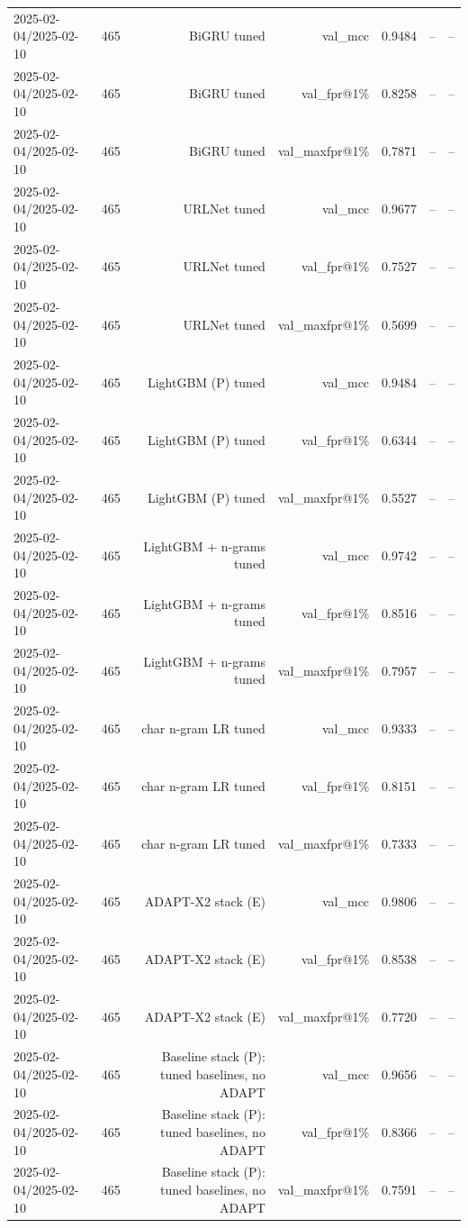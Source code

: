 \begin{table}[t]
\begin{tabular}{llrrrrr}
2025-02-04/2025-02-10 & 465 & BiGRU tuned & val\_mcc & 0.9484 & -- & -- \\
2025-02-04/2025-02-10 & 465 & BiGRU tuned & val\_fpr@1\% & 0.8258 & -- & -- \\
2025-02-04/2025-02-10 & 465 & BiGRU tuned & val\_maxfpr@1\% & 0.7871 & -- & -- \\
2025-02-04/2025-02-10 & 465 & URLNet tuned & val\_mcc & 0.9677 & -- & -- \\
2025-02-04/2025-02-10 & 465 & URLNet tuned & val\_fpr@1\% & 0.7527 & -- & -- \\
2025-02-04/2025-02-10 & 465 & URLNet tuned & val\_maxfpr@1\% & 0.5699 & -- & -- \\
2025-02-04/2025-02-10 & 465 & LightGBM (P) tuned & val\_mcc & 0.9484 & -- & -- \\
2025-02-04/2025-02-10 & 465 & LightGBM (P) tuned & val\_fpr@1\% & 0.6344 & -- & -- \\
2025-02-04/2025-02-10 & 465 & LightGBM (P) tuned & val\_maxfpr@1\% & 0.5527 & -- & -- \\
2025-02-04/2025-02-10 & 465 & LightGBM + n-grams tuned & val\_mcc & 0.9742 & -- & -- \\
2025-02-04/2025-02-10 & 465 & LightGBM + n-grams tuned & val\_fpr@1\% & 0.8516 & -- & -- \\
2025-02-04/2025-02-10 & 465 & LightGBM + n-grams tuned & val\_maxfpr@1\% & 0.7957 & -- & -- \\
2025-02-04/2025-02-10 & 465 & char n-gram LR tuned & val\_mcc & 0.9333 & -- & -- \\
2025-02-04/2025-02-10 & 465 & char n-gram LR tuned & val\_fpr@1\% & 0.8151 & -- & -- \\
2025-02-04/2025-02-10 & 465 & char n-gram LR tuned & val\_maxfpr@1\% & 0.7333 & -- & -- \\
2025-02-04/2025-02-10 & 465 & ADAPT-X2 stack (E) & val\_mcc & 0.9806 & -- & -- \\
2025-02-04/2025-02-10 & 465 & ADAPT-X2 stack (E) & val\_fpr@1\% & 0.8538 & -- & -- \\
2025-02-04/2025-02-10 & 465 & ADAPT-X2 stack (E) & val\_maxfpr@1\% & 0.7720 & -- & -- \\
2025-02-04/2025-02-10 & 465 & Baseline stack (P): tuned baselines, no ADAPT & val\_mcc & 0.9656 & -- & -- \\
2025-02-04/2025-02-10 & 465 & Baseline stack (P): tuned baselines, no ADAPT & val\_fpr@1\% & 0.8366 & -- & -- \\
2025-02-04/2025-02-10 & 465 & Baseline stack (P): tuned baselines, no ADAPT & val\_maxfpr@1\% & 0.7591 & -- & -- \\

\end{tabular}
\end{table}

